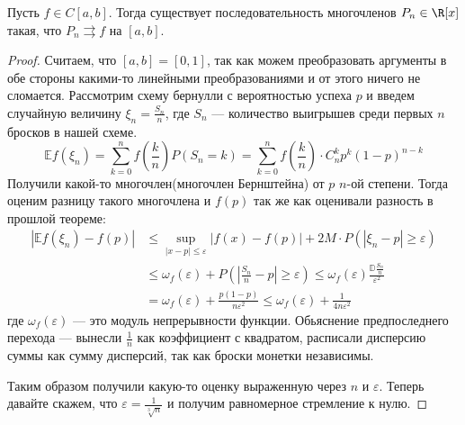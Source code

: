  \begin{theorem}[Вейерштрасса]
    Пусть $f \in C[a, b]$. Тогда существует последовательность многочленов $P_n \in \R[x]$ такая, что $P_n \rightrightarrows f$ на $[a, b]$.
 \end{theorem}
 \begin{proof}
     Считаем, что $[a, b] = [0, 1]$, так как можем преобразовать аргументы в обе стороны какими-то линейными преобразованиями и от этого ничего не сломается. Рассмотрим схему бернулли с вероятностью успеха $p$ и введем случайную величину $\xi_n = \frac{S_n}{n}$, где $S_n$ --- количество выигрышев среди первых $n$ бросков в нашей схеме. 
     \begin{equation*}
         \mathbb{E} f(\xi_n) = 
         \sum\limits_{k = 0}^n f\left( \frac{k}{n}\right) P(S_n = k) = 
         \sum\limits_{k = 0}^n f\left( \frac{k}{n}\right) \cdot C_n^k p^k (1-p)^{n - k}
     \end{equation*}
     Получили какой-то многочлен(многочлен Бернштейна) от $p$ $n$-ой степени. Тогда оценим разницу такого многочлена и $f(p)$ так же как оценивали разность в прошлой теореме:
     \begin{align*}
         | \mathbb{E} f(\xi_n) - f(p) | 
         &\leq 
         \sup\limits_{|x - p| \leq \varepsilon} |f(x) - f(p)| + 2M \cdot P(|\xi_n - p| \geq \varepsilon) \\
         &\leq 
         \omega_f(\varepsilon) + P \left(\left | \frac{S_n}{n} - p \right | \geq \varepsilon \right) \leq \omega_f(\varepsilon) \frac{\mathbb{D} \frac{S_n}{n}}{\varepsilon^2} \\
         &=
         \omega_f(\varepsilon) + \frac{p(1 - p)}{n\varepsilon^2} \leq 
         \omega_f(\varepsilon) + \frac{1}{4n\varepsilon^2}
     \end{align*}
     где $\omega_f(\varepsilon)$ --- это модуль непрерывности функции. Обьяснение предпоследнего перехода --- вынесли $\frac{1}{n}$ как коэффициент с квадратом, расписали дисперсию суммы как сумму дисперсий, так как броски монетки независимы.
     
     Таким образом получили какую-то оценку выраженную через $n$ и $\varepsilon$. Теперь давайте скажем, что $\varepsilon = \frac{1}{\sqrt[3]{n}}$ и получим равномерное стремление к нулю.
 \end{proof}
